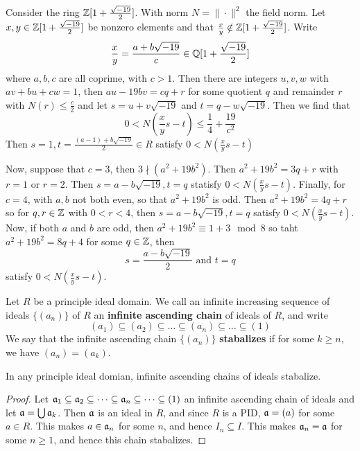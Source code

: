 \begin{example}\label{example_6.5}
  Consider the ring $\mathbb{Z}[1+\frac{\sqrt{-19}}{2}]$. With norm  $N=\|\cdot\|^2$
  the field norm. Let $x,y \in \mathbb{Z}[1+\frac{\sqrt{-19}}{2}]$ be nonzero elements
  and that $\frac{x}{y} \notin \mathbb{Z}[1+\frac{\sqrt{-19}}{2}]$. Write
  \begin{equation*}
    \frac{x}{y}=\frac{a+b\sqrt{-19}}{c} \in \mathbb{Q}[1+\frac{\sqrt{-19}}{2}]
  \end{equation*}
  where $a,b,c$ are all coprime, with  $c>1$. Then there are integers $u,v,w$
  with $av+bu+cw=1$, then  $au-19bv=cq+r$ for some quotient $q$ and remainder
  $r$ with  $N(r) \leq \frac{c}{2}$ and let $s=u+v\sqrt{-19}$ and
  $t=q-w\sqrt{-19}$. Then we find that
  \begin{equation*}
    0<N(\frac{x}{y}s-t) \leq \frac{1}{4}+\frac{19}{c^2}
  \end{equation*}
  Then $s=1, t=\frac{(a-1)+b\sqrt{-19}}{2} \in R$ satisfy $0<N(\frac{x}{y}s-t)$

  Now, suppose that $c=3$, then $3 \nmid (a^2+19b^2)$. Then $a^2+19b^2=3q+r$
  with  $r=1$ or $r=2$. Then $s=a-b\sqrt{-19},t=q$ statisfy
  $0<N(\frac{x}{y}s-t)$. Finally, for $c=4$, with $a,b$ not both even, so
  that $a^2+19b^2$ is odd. Then $a^2+19b^2=4q+r$ so for $q,r \in \mathbb{Z}$ with
  $0<r<4$, then $s=a-b\sqrt{-19}, t=q$ satisfy $0<N(\frac{x}{y}s-t)$. Now, if
  both $a$ and  $b$ are odd, then  $a^2+19b^2 \equiv 1+3 \mod{8}$ so taht
  $a^2+19b^2=8q+4$ for some  $q \in \mathbb{Z}$, then
  \begin{equation*}
    s=\frac{a-b\sqrt{-19}}{2} \text{ and } t=q
  \end{equation*}
  satisfy $0<N(\frac{x}{y}s-t)$.
\end{example}


\begin{definition}
  Let $R$ be a principle ideal domain. We call an infinite increasing sequence
  of ideals $\{(a_n)\}$ of $R$ an \textbf{infinite ascending chain} of
  ideals of $R$, and write
  \begin{equation*}
    (a_1) \subseteq (a_2) \subseteq \dots \subseteq (a_n) \subseteq \dots \subseteq (1)
  \end{equation*}
  We say that the infinite ascending chain $\{(a_n)\}$ \textbf{stabalizes} if
  for some $k \geq n$, we have  $(a_n)=(a_k)$.
\end{definition}

\begin{lemma}\label{lemma_6.2.4}
  In any principle ideal domian, infinite ascending chains of ideals
  stabalize.
\end{lemma}
\begin{proof}
  Let $\mathfrak{a}_1 \subseteq \mathfrak{a}_2 \subseteq \dots \subseteq \mathfrak{a}_n \subseteq
  \dots \subseteq (1)$ an infinite ascending chain of ideals and let
  $\mathfrak{a}=\bigcup{\mathfrak{a}_k}$. Then $\mathfrak{a}$ is an ideal in  $R$, and since
  $R$ is a PID,  $\mathfrak{a}=(a)$ for some $a \in R$. This makes  $a \in \mathfrak{a}_n$
  for some  $n$, and hence  $I_n \subseteq I$. This makes $\mathfrak{a}_n=\mathfrak{a}$ for some
  $n \geq 1$, and hence this chain stabalizes.
\end{proof}


